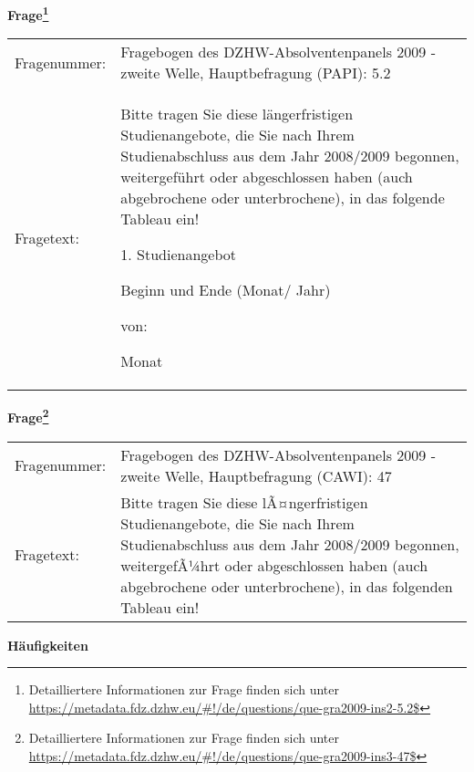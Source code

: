 				\vspace*{0.5cm}
                \noindent\textbf{Frage\footnote{Detailliertere Informationen zur Frage finden sich unter
		              \url{https://metadata.fdz.dzhw.eu/\#!/de/questions/que-gra2009-ins2-5.2$}}}\\
				\begin{tabularx}{\hsize}{@{}lX}
					Fragenummer: &
					  Fragebogen des DZHW-Absolventenpanels 2009 - zweite Welle, Hauptbefragung (PAPI):
					  5.2
 \\
					Fragetext: & Bitte tragen Sie diese längerfristigen Studienangebote, die Sie nach Ihrem Studienabschluss aus dem Jahr 2008/2009 begonnen, weitergeführt oder abgeschlossen haben (auch abgebrochene oder unterbrochene), in das folgende Tableau ein!\par  1. Studienangebot\par  Beginn und Ende (Monat/ Jahr)\par  von:\par  Monat \\
				\end{tabularx}
				\vspace*{0.5cm}
                \noindent\textbf{Frage\footnote{Detailliertere Informationen zur Frage finden sich unter
		              \url{https://metadata.fdz.dzhw.eu/\#!/de/questions/que-gra2009-ins3-47$}}}\\
				\begin{tabularx}{\hsize}{@{}lX}
					Fragenummer: &
					  Fragebogen des DZHW-Absolventenpanels 2009 - zweite Welle, Hauptbefragung (CAWI):
					  47
 \\
					Fragetext: & Bitte tragen Sie diese lÃ¤ngerfristigen Studienangebote, die Sie nach Ihrem Studienabschluss aus dem Jahr 2008/2009 begonnen, weitergefÃ¼hrt oder abgeschlossen haben (auch abgebrochene oder unterbrochene), in das folgenden Tableau ein! \\
				\end{tabularx}





        		\vspace*{0.5cm}
                \noindent\textbf{Häufigkeiten}

